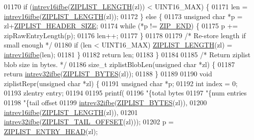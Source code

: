\begin{DoxyCode}
{{01170     \textcolor{keywordflow}{if} (\hyperlink{endianconv_8h_a47540b5867d4cb1e322e83eaf2b50b56}{intrev16ifbe}(\hyperlink{ziplist_8c_a6d779e84aca736e354768fcf87393b98}{ZIPLIST\_LENGTH}(zl)) < UINT16\_MAX) \{
01171         len = \hyperlink{endianconv_8h_a47540b5867d4cb1e322e83eaf2b50b56}{intrev16ifbe}(\hyperlink{ziplist_8c_a6d779e84aca736e354768fcf87393b98}{ZIPLIST\_LENGTH}(zl));
01172     \} \textcolor{keywordflow}{else} \{
01173         \textcolor{keywordtype}{unsigned} \textcolor{keywordtype}{char} *p = zl+\hyperlink{ziplist_8c_a3b8ef40d77ce00bcad424d0c07e2de95}{ZIPLIST\_HEADER\_SIZE};
01174         \textcolor{keywordflow}{while} (*p != \hyperlink{ziplist_8c_a31a8f9d5b5bad75318741cfca5de5ea8}{ZIP\_END}) \{
01175             p += zipRawEntryLength(p);
01176             len++;
01177         \}
01178 
01179         \textcolor{comment}{/* Re-store length if small enough */}
01180         \textcolor{keywordflow}{if} (len < UINT16\_MAX) \hyperlink{ziplist_8c_a6d779e84aca736e354768fcf87393b98}{ZIPLIST\_LENGTH}(zl) = 
      \hyperlink{endianconv_8h_a47540b5867d4cb1e322e83eaf2b50b56}{intrev16ifbe}(len);
01181     \}
01182     \textcolor{keywordflow}{return} len;
01183 \}
01184 
01185 \textcolor{comment}{/* Return ziplist blob size in bytes. */}
01186 size\_t ziplistBlobLen(\textcolor{keywordtype}{unsigned} \textcolor{keywordtype}{char} *zl) \{
01187     \textcolor{keywordflow}{return} \hyperlink{endianconv_8h_a4e85d9ae58a3b1e6ceaabfd4689002c7}{intrev32ifbe}(\hyperlink{ziplist_8c_a28b9c7884758bc2d52f204903a4bb642}{ZIPLIST\_BYTES}(zl));
01188 \}
01189 
01190 \textcolor{keywordtype}{void} ziplistRepr(\textcolor{keywordtype}{unsigned} \textcolor{keywordtype}{char} *zl) \{
01191     \textcolor{keywordtype}{unsigned} \textcolor{keywordtype}{char} *p;
01192     \textcolor{keywordtype}{int} index = 0;
01193     zlentry entry;
01194 
01195     printf(
01196         \textcolor{stringliteral}{"\{total bytes %
01197         \textcolor{stringliteral}{"\{num entries %
01198         \textcolor{stringliteral}{"\{tail offset %
01199         \hyperlink{endianconv_8h_a4e85d9ae58a3b1e6ceaabfd4689002c7}{intrev32ifbe}(\hyperlink{ziplist_8c_a28b9c7884758bc2d52f204903a4bb642}{ZIPLIST\_BYTES}(zl)),
01200         \hyperlink{endianconv_8h_a47540b5867d4cb1e322e83eaf2b50b56}{intrev16ifbe}(\hyperlink{ziplist_8c_a6d779e84aca736e354768fcf87393b98}{ZIPLIST\_LENGTH}(zl)),
01201         \hyperlink{endianconv_8h_a4e85d9ae58a3b1e6ceaabfd4689002c7}{intrev32ifbe}(\hyperlink{ziplist_8c_adf2235d74c81861c85fb5d2ffa209397}{ZIPLIST\_TAIL\_OFFSET}(zl)));
01202     p = \hyperlink{ziplist_8c_a4f6c9857a0ae335f2c4b214b63b5a6c8}{ZIPLIST\_ENTRY\_HEAD}(zl);
}}}}}
\end{DoxyCode}
